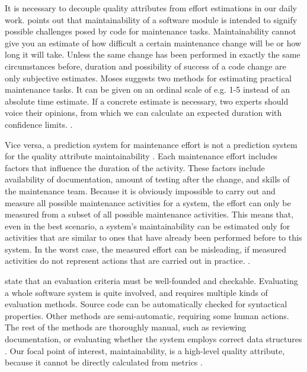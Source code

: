 \documentclass[utf8,english]{gradu3}
\begin{document}
It is necessary to decouple quality attributes from effort estimations in our
daily work. \textcite{Moses2009} points out that maintainability of a software
module is intended to signify possible challenges posed by code for maintenance
tasks. Maintainability cannot give you an estimate of how difficult a certain
maintenance change will be or how long it will take. Unless the same change has
been performed in exactly the same circumstances before, duration and
possibility of success of a code change are only subjective estimates. Moses
suggests two methods for estimating practical maintenance tasks. It can be given
on an ordinal scale of e.g. 1-5 instead of an absolute time estimate. If a
concrete estimate is necessary, two experts should voice their opinions, from
which we can calculate an expected duration with confidence limits.
\parencite[204]{Moses2009}.

Vice versa, a prediction system for maintenance effort is not a prediction
system for the quality attribute maintainability \parencite[206]{Moses2009}.
Each maintenance effort includes factors that influence the duration of the
activity. These factors include availability of documentation, amount of
testing after the change, and skills of the maintenance team. Because it is
obviously impossible to carry out and measure all possible maintenance
activities for a system, the effort can only be measured from a subset of all
possible maintenance activities. This means that, even in the best scenario, a
system's maintainability can be estimated only for activities that are similar
to ones that have already been performed before to this system. In the worst
case, the measured effort can be misleading, if measured activities do not
represent actions that are carried out in practice. \parencite[206]{Moses2009}.

\textcite{Broy2006} state that an evaluation criteria must be well-founded and
checkable. Evaluating a whole software system is quite involved, and requires
multiple kinds of evaluation methods. Source code can be automatically checked
for syntactical properties. Other methods are semi-automatic, requiring some
human actions. The rest of the methods are thoroughly manual, such as reviewing documentation,
or evaluating whether the system employs correct data structures
\parencite[22]{Broy2006}. Our focal point of interest, maintainability, is a
high-level quality attribute, because it cannot be directly calculated from
metrics \parencite[60]{Arvanitou2017}.
\end{document}
